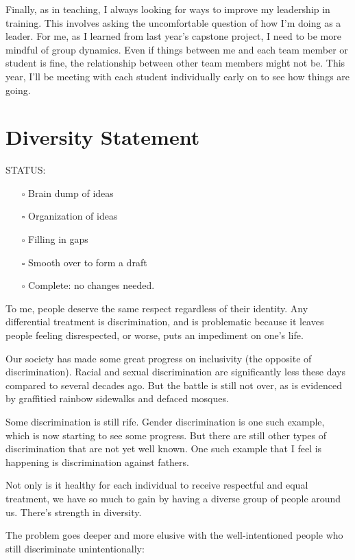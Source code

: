 \documentclass[]{article}
\providecommand{\tightlist}{%
  \setlength{\itemsep}{0pt}\setlength{\parskip}{0pt}}
\begin{document}
Finally, as in teaching, I always looking for ways to improve my leadership in training. This involves asking the uncomfortable question of how I'm doing as a leader. For me, as I learned from last year's capstone project, I need to be more mindful of group dynamics. Even if things between me and each team member or student is fine, the relationship between other team members might not be. This year, I'll be meeting with each student individually early on to see how things are going.

\hypertarget{diversity-statement}{%
\section{Diversity Statement}\label{diversity-statement}}

STATUS:

\begin{itemize}
\tightlist
\item[$\square$]
  Brain dump of ideas
\item[$\square$]
  Organization of ideas
\item[$\square$]
  Filling in gaps
\item[$\square$]
  Smooth over to form a draft
\item[$\square$]
  Complete: no changes needed.
\end{itemize}

To me, people deserve the same respect regardless of their identity. Any differential treatment is discrimination, and is problematic because it leaves people feeling disrespected, or worse, puts an impediment on one's life.

Our society has made some great progress on inclusivity (the opposite of discrimination). Racial and sexual discrimination are significantly less these days compared to several decades ago. But the battle is still not over, as is evidenced by graffitied rainbow sidewalks and defaced mosques.

Some discrimination is still rife. Gender discrimination is one such example, which is now starting to see some progress. But there are still other types of discrimination that are not yet well known. One such example that I feel is happening is discrimination against fathers.

Not only is it healthy for each individual to receive respectful and equal treatment, we have so much to gain by having a diverse group of people around us. There's strength in diversity.

The problem goes deeper and more elusive with the well-intentioned people who still discriminate unintentionally:
\end{document}
